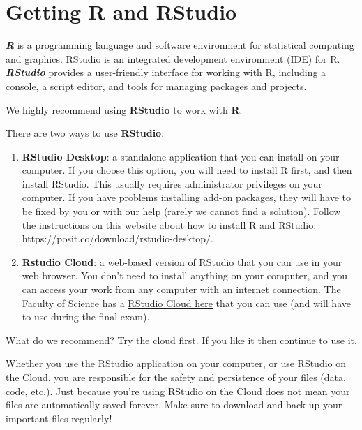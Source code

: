 \documentclass[
  letterpaper,
  8pt,
  a4paper]{book}
\begin{document}
\section*{Getting R and RStudio}\label{getting-r-and-rstudio}


\textbf{\emph{R}} is a programming language and software environment for
statistical computing and graphics. RStudio is an integrated development
environment (IDE) for R. \textbf{\emph{RStudio}} provides a
user-friendly interface for working with R, including a console, a
script editor, and tools for managing packages and projects.

We highly recommend using \textbf{RStudio} to work with \textbf{R}.

There are two ways to use \textbf{RStudio}:

\begin{enumerate}
\def\labelenumi{\arabic{enumi}.}
\item
  \textbf{RStudio Desktop}: a standalone application that you can
  install on your computer. If you choose this option, you will need to
  install R first, and then install RStudio. This usually requires
  administrator privileges on your computer. If you have problems
  installing add-on packages, they will have to be fixed by you or with
  our help (rarely we cannot find a solution). Follow the instructions
  on this website about how to install R and RStudio:
  https://posit.co/download/rstudio-desktop/.
\item
  \textbf{Rstudio Cloud}: a web-based version of RStudio that you can
  use in your web browser. You don't need to install anything on your
  computer, and you can access your work from any computer with an
  internet connection. The Faculty of Science has a
  \href{https://rstudio2024.mnf.uzh.ch}{RStudio Cloud here} that you can
  use (and will have to use during the final exam).
\end{enumerate}

What do we recommend? Try the cloud first. If you like it then continue
to use it.

\begin{tcolorbox}[enhanced jigsaw, arc=.35mm, bottomrule=.15mm, bottomtitle=1mm, breakable, colback=white, colbacktitle=quarto-callout-important-color!10!white, colframe=quarto-callout-important-color-frame, coltitle=black, left=2mm, leftrule=.75mm, opacityback=0, opacitybacktitle=0.6, rightrule=.15mm, title=\textcolor{quarto-callout-important-color}{\faExclamation}\hspace{0.5em}{Important}, titlerule=0mm, toprule=.15mm, toptitle=1mm]

Whether you use the RStudio application on your computer, or use RStudio
on the Cloud, you are responsible for the safety and persistence of your
files (data, code, etc.). Just because you're using RStudio on the Cloud
does not mean your files are automatically saved forever. Make sure to
download and back up your important files regularly!

\end{tcolorbox}
\end{document}

